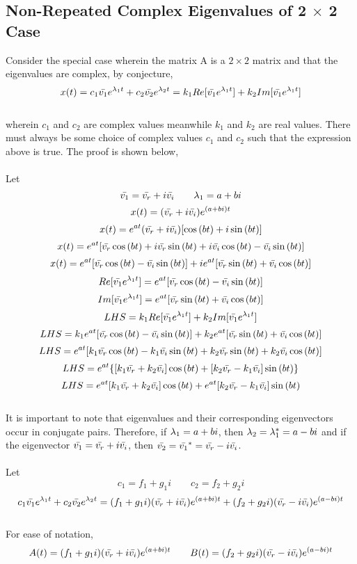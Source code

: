 \documentclass[class=report, 12pt, crop=false]{standalone}
\begin{document}
\begin{center}
\section{Non-Repeated Complex Eigenvalues of 2 $\times$ 2 Case}
\begin{comment}
\end{comment}
Consider the special case wherein the matrix A is a $2\times2$ matrix and that the eigenvalues are complex, by conjecture,
$$x(t) = c_1\bar{v_1}e^{\lambda_1 t} + c_2\bar{v_2}e^{\lambda_2 t} = k_1Re[\bar{v_1}e^{\lambda_1 t}] + k_2Im[\bar{v_1}e^{\lambda_1 t}]$$
\\wherein $c_1$ and $c_2$ are complex values meanwhile $k_1$ and $k_2$ are real values. There must always be some choice of complex values $c_1$ and $c_2$ such that the expression above is true. The proof is shown below,
\\~\\Let 
$$\bar{v_1} = \bar{v_r} + i\bar{v_i}\qquad \lambda_1 = a + bi$$
$$x(t) = (\bar{v_r} + i\bar{v_i})e^{(a+bi)t}$$
$$x(t) = e^{at}(\bar{v_r} + i\bar{v_i})[\cos{(bt)} + i\sin{(bt)}]$$
$$x(t) = e^{at}[\bar{v_r}\cos{(bt)} + i\bar{v_r}\sin{(bt)} + i\bar{v_i}\cos{(bt)} - \bar{v_i}\sin{(bt)}]$$
$$x(t) = e^{at}[\bar{v_r}\cos{(bt)} - \bar{v_i}\sin{(bt)}]+ ie^{at}[\bar{v_r}\sin{(bt)} + \bar{v_i}\cos{(bt)}]$$
$$Re[\bar{v_1}e^{\lambda_1 t}] = e^{at}[\bar{v_r}\cos{(bt)} - \bar{v_i}\sin{(bt)}]$$
$$Im[\bar{v_1}e^{\lambda_1 t}] = e^{at}[\bar{v_r}\sin{(bt)} + \bar{v_i}\cos{(bt)}]$$
$$LHS = k_1Re[\bar{v_1}e^{\lambda_1 t}] + k_2Im[\bar{v_1}e^{\lambda_1 t}]$$
$$LHS = k_1e^{at}[\bar{v_r}\cos{(bt)} - \bar{v_i}\sin{(bt)}] + k_2e^{at}[\bar{v_r}\sin{(bt)} + \bar{v_i}\cos{(bt)}]$$
$$LHS = e^{at}[k_1\bar{v_r}\cos{(bt)} - k_1\bar{v_i}\sin{(bt)} + k_2\bar{v_r}\sin{(bt)} + k_2\bar{v_i}\cos{(bt)}]$$
$$LHS = e^{at}\{[k_1\bar{v_r}+ k_2\bar{v_i}]\cos{(bt)}  + [k_2\bar{v_r}- k_1\bar{v_i}]\sin{(bt)}\}$$
$$LHS = e^{at}[k_1\bar{v_r}+ k_2\bar{v_i}]\cos{(bt)}  + e^{at}[k_2\bar{v_r}- k_1\bar{v_i}]\sin{(bt)}$$
\\It is important to note that eigenvalues and their corresponding eigenvectors occur in conjugate pairs. Therefore, if $\lambda_1 = a+bi$, then $\lambda_2 = \lambda_1^\ast = a - bi$ and if the eigenvector $\bar{v_1} = \bar{v_r} + i\bar{v_i}$, then $\bar{v_2} =\bar{v_1}^\ast= \bar{v_r} - i\bar{v_i}$.
\\~\\Let
$$c_1 = f_1 + g_1i\qquad c_2 = f_2 + g_2i$$
$$c_1\bar{v_1}e^{\lambda_1 t} + c_2\bar{v_2}e^{\lambda_2 t} = (f_1 + g_1i)(\bar{v_r} + i\bar{v_i})e^{(a+bi)t} + (f_2 + g_2i)(\bar{v_r} - i\bar{v_i})e^{(a-bi)t}$$
\\For ease of notation,
$$A(t) = (f_1 + g_1i)(\bar{v_r} + i\bar{v_i})e^{(a+bi)t}\qquad B(t) = (f_2 + g_2i)(\bar{v_r} - i\bar{v_i})e^{(a-bi)t}$$

\end{center}
\end{document}
